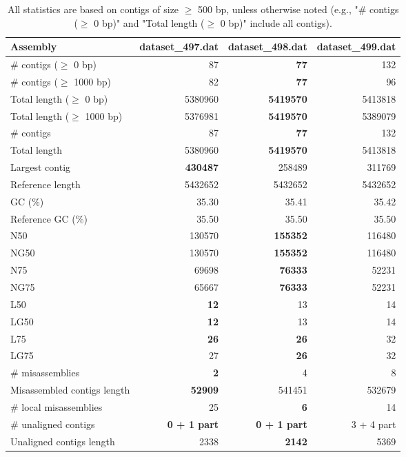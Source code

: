 \documentclass[12pt,a4paper]{article}
\begin{document}
\begin{table}[ht]
\begin{center}
\caption{All statistics are based on contigs of size $\geq$ 500 bp, unless otherwise noted (e.g., "\# contigs ($\geq$ 0 bp)" and "Total length ($\geq$ 0 bp)" include all contigs).}
\begin{tabular}{|l*{3}{|r}|}
\hline
Assembly & dataset\_497.dat & dataset\_498.dat & dataset\_499.dat \\ \hline
\# contigs ($\geq$ 0 bp) & 87 & {\bf 77} & 132 \\ \hline
\# contigs ($\geq$ 1000 bp) & 82 & {\bf 77} & 96 \\ \hline
Total length ($\geq$ 0 bp) & 5380960 & {\bf 5419570} & 5413818 \\ \hline
Total length ($\geq$ 1000 bp) & 5376981 & {\bf 5419570} & 5389079 \\ \hline
\# contigs & 87 & {\bf 77} & 132 \\ \hline
Total length & 5380960 & {\bf 5419570} & 5413818 \\ \hline
Largest contig & {\bf 430487} & 258489 & 311769 \\ \hline
Reference length & 5432652 & 5432652 & 5432652 \\ \hline
GC (\%) & 35.30 & 35.41 & 35.42 \\ \hline
Reference GC (\%) & 35.50 & 35.50 & 35.50 \\ \hline
N50 & 130570 & {\bf 155352} & 116480 \\ \hline
NG50 & 130570 & {\bf 155352} & 116480 \\ \hline
N75 & 69698 & {\bf 76333} & 52231 \\ \hline
NG75 & 65667 & {\bf 76333} & 52231 \\ \hline
L50 & {\bf 12} & 13 & 14 \\ \hline
LG50 & {\bf 12} & 13 & 14 \\ \hline
L75 & {\bf 26} & {\bf 26} & 32 \\ \hline
LG75 & 27 & {\bf 26} & 32 \\ \hline
\# misassemblies & {\bf 2} & 4 & 8 \\ \hline
Misassembled contigs length & {\bf 52909} & 541451 & 532679 \\ \hline
\# local misassemblies & 25 & {\bf 6} & 14 \\ \hline
\# unaligned contigs & {\bf 0 + 1 part} & {\bf 0 + 1 part} & 3 + 4 part \\ \hline
Unaligned contigs length & 2338 & {\bf 2142} & 5369 \\ \hline

\end{tabular}
\end{center}
\end{table}
\end{document}
